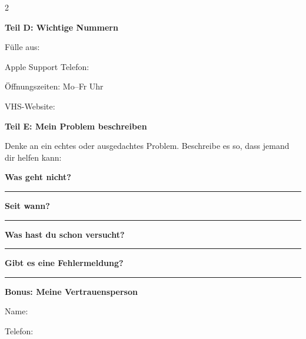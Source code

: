 \documentclass[a4paper,landscape,8pt]{extarticle}
\begin{document}
\begin{multicols}{2}
\columnbreak

\textbf{\large Teil D: Wichtige Nummern}

Fülle aus:

\vspace{3mm}

Apple Support Telefon: \dotfill

\vspace{2mm}

Öffnungszeiten: Mo--Fr \dotfill Uhr

\vspace{2mm}

VHS-Website: \dotfill

\vspace{6mm}

\textbf{\large Teil E: Mein Problem beschreiben}

Denke an ein echtes oder ausgedachtes Problem. Beschreibe es so, dass jemand dir helfen kann:

\vspace{3mm}

\textbf{Was geht nicht?}\\
\rule{\linewidth}{0.4pt}

\vspace{3mm}

\textbf{Seit wann?}\\
\rule{\linewidth}{0.4pt}

\vspace{3mm}

\textbf{Was hast du schon versucht?}\\
\rule{\linewidth}{0.4pt}

\vspace{3mm}

\textbf{Gibt es eine Fehlermeldung?}\\
\rule{\linewidth}{0.4pt}

\vspace{5mm}

\textbf{Bonus: Meine Vertrauensperson}

\vspace{2mm}

Name: \dotfill

\vspace{2mm}

Telefon: \dotfill

\end{multicols}

\newpage

\end{document}
